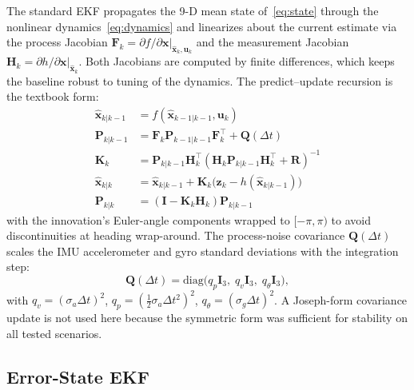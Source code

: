 \documentclass[conference]{IEEEtran}
\begin{document}
The standard EKF propagates the 9-D mean state of~\eqref{eq:state} through the nonlinear dynamics~\eqref{eq:dynamics} and linearizes about the current estimate via the process Jacobian $\mathbf{F}_k = \left.\partial f/\partial \mathbf{x}\right|_{\hat{\mathbf{x}}_k,\mathbf{u}_k}$ and the measurement Jacobian $\mathbf{H}_k = \left.\partial h/\partial \mathbf{x}\right|_{\hat{\mathbf{x}}_k}$. Both Jacobians are computed by finite differences, which keeps the baseline robust to tuning of the dynamics. The predict--update recursion is the textbook form:
\begin{align}
  \hat{\mathbf{x}}_{k|k-1} &= f(\hat{\mathbf{x}}_{k-1|k-1}, \mathbf{u}_k) \\
  \mathbf{P}_{k|k-1} &= \mathbf{F}_k \mathbf{P}_{k-1|k-1} \mathbf{F}_k^\top + \mathbf{Q}(\Delta t) \\
  \mathbf{K}_k &= \mathbf{P}_{k|k-1} \mathbf{H}_k^\top (\mathbf{H}_k \mathbf{P}_{k|k-1} \mathbf{H}_k^\top + \mathbf{R})^{-1} \\
  \hat{\mathbf{x}}_{k|k} &= \hat{\mathbf{x}}_{k|k-1} + \mathbf{K}_k \bigl(\mathbf{z}_k - h(\hat{\mathbf{x}}_{k|k-1})\bigr) \\
  \mathbf{P}_{k|k} &= (\mathbf{I} - \mathbf{K}_k \mathbf{H}_k) \mathbf{P}_{k|k-1}
\end{align}
with the innovation's Euler-angle components wrapped to $[-\pi, \pi)$ to avoid discontinuities at heading wrap-around. The process-noise covariance $\mathbf{Q}(\Delta t)$ scales the IMU accelerometer and gyro standard deviations with the integration step:
\begin{equation}
  \mathbf{Q}(\Delta t) = \mathrm{diag}\bigl(q_p \mathbf{I}_3,\; q_v \mathbf{I}_3,\; q_\theta \mathbf{I}_3\bigr),
\end{equation}
with $q_v = (\sigma_a \Delta t)^2$, $q_p = (\tfrac{1}{2}\sigma_a \Delta t^2)^2$, $q_\theta = (\sigma_g \Delta t)^2$. A Joseph-form covariance update is not used here because the symmetric form was sufficient for stability on all tested scenarios.

\subsection{Error-State EKF}
\end{document}
